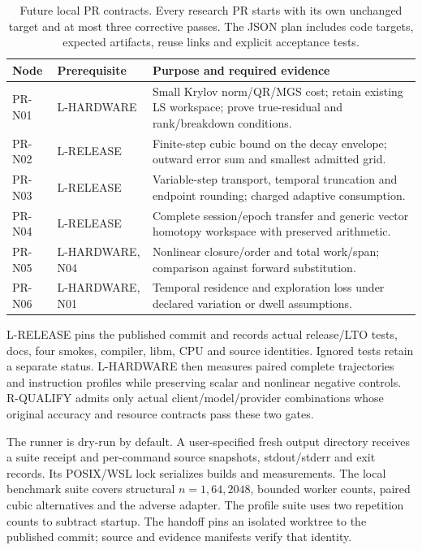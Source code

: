 \documentclass[aps,pra,reprint,onecolumn,12pt,notitlepage,superscriptaddress,nofootinbib]{revtex4-2}
\begin{document}
\begin{table}[tb]
\caption{Future local PR contracts. Every research PR starts with its own
unchanged target and at most three corrective passes. The JSON plan includes
code targets, expected artifacts, reuse links and explicit acceptance tests.}
\begin{ruledtabular}
\begin{tabular}{p{}p{}p{}}
Node & Prerequisite & Purpose and required evidence\\
\hline
PR-N01 & L-HARDWARE & Small Krylov norm/QR/MGS cost; retain existing LS
workspace; prove true-residual and rank/breakdown conditions.\\
PR-N02 & L-RELEASE & Finite-step cubic bound on the decay envelope;
outward error sum and smallest admitted grid.\\
PR-N03 & L-RELEASE & Variable-step transport, temporal truncation and
endpoint rounding; charged adaptive consumption.\\
PR-N04 & L-RELEASE & Complete session/epoch transfer and generic vector
homotopy workspace with preserved arithmetic.\\
PR-N05 & L-HARDWARE, N04 & Nonlinear closure/order and total work/span;
comparison against forward substitution.\\
PR-N06 & L-HARDWARE, N01 & Temporal residence and exploration loss under
declared variation or dwell assumptions.
\end{tabular}
\end{ruledtabular}
\end{table}

L-RELEASE pins the published commit and records actual release/LTO tests,
docs, four smokes, compiler, libm, CPU and source identities. Ignored tests
retain a separate status. L-HARDWARE then measures paired complete trajectories
and instruction profiles while preserving scalar and nonlinear negative
controls. R-QUALIFY admits only actual client/model/provider combinations
whose original accuracy and resource contracts pass these two gates.

The runner is dry-run by default. A user-specified fresh output directory
receives a suite receipt and per-command source snapshots, stdout/stderr
and exit records. Its POSIX/WSL lock serializes builds and measurements.
The local benchmark suite covers structural $n=1,64,2048$, bounded worker
counts, paired cubic alternatives and the adverse adapter. The profile
suite uses two repetition counts to subtract startup. The handoff pins an
isolated worktree to the published commit; source and evidence manifests
verify that identity.
\end{document}
